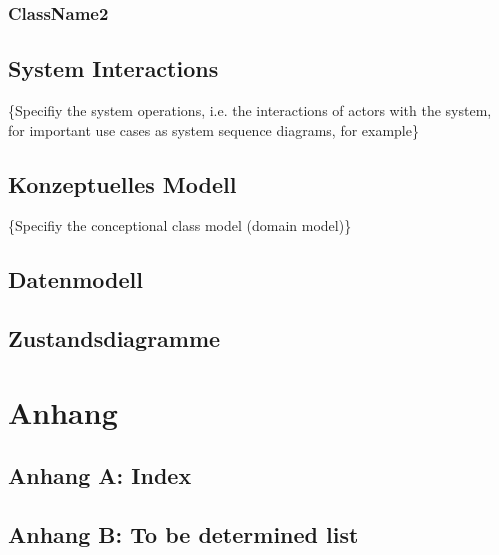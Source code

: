 \subsubsection{ClassName2}

\subsection{System Interactions}
\{Specifiy the system operations, i.e. the interactions of actors with the system, for important use cases as system sequence diagrams, for example\}

\subsection{Konzeptuelles Modell}
\{Specifiy the conceptional class model (domain model)\}

\subsection{Datenmodell}

\subsection{Zustandsdiagramme}

\newpage

\setcounter{secnumdepth}{0}
\section{Anhang}

\subsection{Anhang A: Index}

\subsection{Anhang B: To be determined list}


